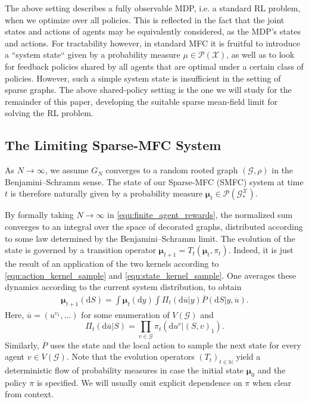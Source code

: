 \documentclass{article}
\begin{document}
The above setting describes a fully observable MDP, i.e. a standard RL problem, when we optimize over all policies. This is reflected in the fact that the joint states and actions of agents may be equivalently considered, as the MDP's states and actions. For tractability however, in standard MFC it is fruitful to introduce a ``system state`` given by a probability measure $\mu \in \mathcal P ( \mathcal X)$, as well as to look for feedback policies shared by all agents \cite{saldi2018markov} that are optimal under a certain class of policies. However, such a simple system state is insufficient in the setting of sparse graphs. The above shared-policy setting is the one we will study for the remainder of this paper, developing the suitable sparse mean-field limit for solving the RL problem.

\subsection{The Limiting Sparse-MFC System}
As $N \to \infty$, we assume $G_N$ converges to a random rooted graph $(\mathcal{G}, \rho)$ in the Benjamini--Schramm sense. 
The state of our Sparse-MFC (SMFC) system at time $t$ is therefore naturally given by a probability measure $\boldsymbol{\mu}_t \in \mathcal{P}(\mathcal{G}_*^{\mathcal{X}})$.

By formally taking $N \to \infty$ in \eqref{equ:finite_agent_rewards}, the normalized sum  converges to an integral over the space of decorated graphs, distributed according to some law determined by the Benjamini--Schramm limit. The evolution of the state is governed by a transition operator $\boldsymbol{\mu}_{t+1} = T_t(\boldsymbol{\mu}_t, \pi_t)$. Indeed, it is just the result of an application of the two kernels according to \eqref{equ:action_kernel_sample} and \eqref{equ:state_kernel_sample}. One averages these dynamics according to the current system distribution, to obtain
\begin{align}
    \boldsymbol{\mu}_{t+1}(\mathrm d S) = \int \boldsymbol \mu_t (\mathrm d y) \int \Pi_t(\mathrm d \overline u | y) \overline P(\mathrm d S | y, \overline u).
\end{align}
Here, $\overline u = (u^{v_1},...)$ for some enumeration of $V(\mathcal G)$ and
$$\Pi_t(\mathrm d \overline u | S) = \prod\limits_{v \in \mathcal G} \pi_t ( \mathrm d u^v | (S,v)_1).$$
Similarly, $\overline P$ uses the state and the local action to sample the next state for every agent $v \in V(\mathcal G)$.
Note that the evolution operators $(T_t)_{t \in \mathbb N}$ yield a deterministic flow of probability measures in case the initial state $\boldsymbol{\mu}_0$ and the policy $\pi$ is specified.
We will usually omit explicit dependence on $\pi$ when clear from context.
\end{document}
